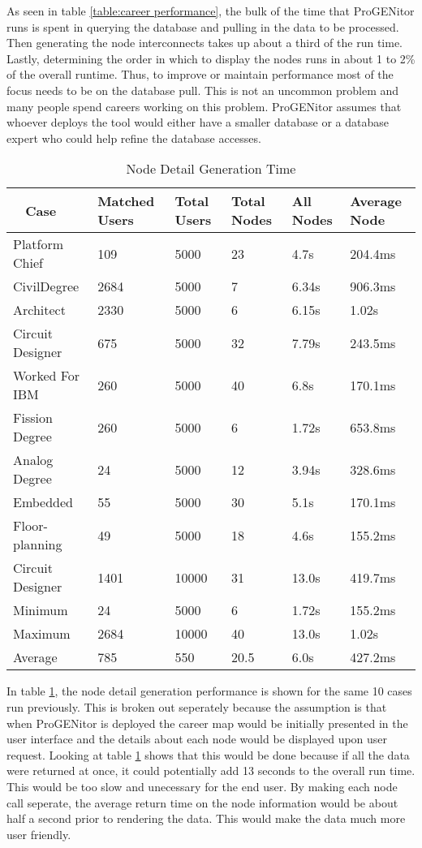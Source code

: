 As seen in table \ref{table:career performance}, the bulk of the time that
ProGENitor runs is spent in querying the database and pulling in the data to be
processed.  Then generating the node interconnects takes up about a third of the
run time. Lastly, determining the order in which to display the nodes runs in
about 1 to 2\% of the overall runtime.  Thus, to improve or maintain performance most of
the focus needs to be on the database pull.  This is not an uncommon problem and
many people spend careers working on this problem.  ProGENitor assumes that
whoever deploys the tool would either have a smaller database or a database
expert who could help refine the database accesses.

\begin{table}[H]
  \centering
  \begin{tabular}{|p{17mm}|p{16mm}|p{10mm}|p{18mm}|p{19mm}|p{20mm}|}
  \hline
  \
  Case&Matched Users&Total Users&Total Nodes&All Nodes&Average Node\\
  \hline\hline
  Platform Chief&109&5000&23&4.7s&204.4ms\\ \hline
  Civil\newline Degree&2684&5000&7&6.34s&906.3ms\\ \hline 
  Architect&2330&5000&6&6.15s&1.02s\\ \hline
  Circuit Designer&675&5000&32&7.79s&243.5ms\\ \hline
  Worked For IBM&260&5000&40&6.8s&170.1ms\\ \hline
  Fission Degree&260&5000&6&1.72s&653.8ms\\ \hline
  Analog Degree&24&5000&12&3.94s&328.6ms\\ \hline
  Embedded&55&5000&30&5.1s&170.1ms\\ \hline
  Floor- \newline planning&49&5000&18&4.6s&155.2ms\\ \hline
  Circuit Designer&1401&10000&31&13.0s&419.7ms\\ \hline
  \hline\hline
  Minimum&24&5000&6&1.72s&155.2ms\\ \hline
  Maximum&2684&10000&40&13.0s&1.02s\\ \hline
  Average&785&550&20.5&6.0s&427.2ms\\ \hline
  \end{tabular}
  \caption{Node Detail Generation Time}
  \label{table:node-perf}
\end{table}

In table \ref{table:node-perf}, the node detail generation performance is shown
for the same 10 cases run previously.  This is broken out seperately because the
assumption is that when ProGENitor is deployed the career map would be initially
presented in the user interface and the details about each node would be
displayed upon user request.  Looking at table \ref{table:node-perf} shows that
this would be done because if all the data were returned at once, it could
potentially add 13 seconds to the overall run time.  This would be too slow and
unecessary for the end user.  By making each node call seperate, the average
return time on the node information would be about half a second prior to
rendering the data.  This would make the data much more user friendly.